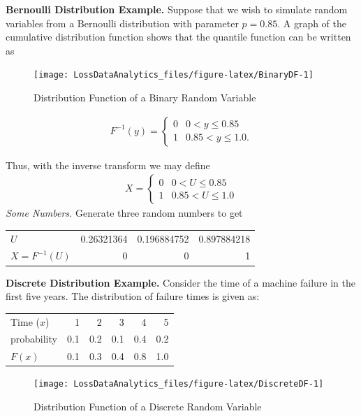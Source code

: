 \documentclass[]{book}
\theoremstyle{definition}
\theoremstyle{definition}
\theoremstyle{definition}
\theoremstyle{remark}
\begin{document}
\textbf{Bernoulli Distribution Example.} Suppose that we wish to
simulate random variables from a Bernoulli distribution with parameter
\(p=0.85\). A graph of the cumulative distribution function shows that
the quantile function can be written as

\begin{figure}

{\centering \texttt{[image: LossDataAnalytics\_files/figure-latex/BinaryDF-1]} 

}

\caption{Distribution Function of a Binary Random Variable}\label{fig:BinaryDF}
\end{figure}

\[\begin{aligned}
F^{-1}(y) = \left\{ \begin{array}{cc}
              0 & 0<y \leq 0.85 \\
              1 & 0.85 < y  \leq  1.0 .
            \end{array} \right.\end{aligned}\]

Thus, with the inverse transform we may define \[\begin{aligned}
X = \left\{ \begin{array}{cc}
              0 & 0<U \leq 0.85  \\
              1 &  0.85 < U  \leq  1.0
            \end{array} \right.\end{aligned}\] \emph{Some Numbers.}
Generate three random numbers to get

\begin{longtable}[]{@{}lrrr@{}}
\toprule
\(U\) & 0.26321364 & 0.196884752 & 0.897884218\tabularnewline
\(X =F^{-1}(U)\) & 0 & 0 & 1\tabularnewline
\bottomrule
\end{longtable}

\textbf{Discrete Distribution Example.} Consider the time of a machine
failure in the first five years. The distribution of failure times is
given as:

\begin{longtable}[]{@{}lrrrrr@{}}
\toprule
Time (\(x\)) & 1 & 2 & 3 & 4 & 5\tabularnewline
probability & 0.1 & 0.2 & 0.1 & 0.4 & 0.2\tabularnewline
\(F(x)\) & 0.1 & 0.3 & 0.4 & 0.8 & 1.0\tabularnewline
\bottomrule
\end{longtable}

\begin{figure}

{\centering \texttt{[image: LossDataAnalytics\_files/figure-latex/DiscreteDF-1]} 

}

\caption{Distribution Function of a Discrete Random Variable}\label{fig:DiscreteDF}
\end{figure}
\end{document}
